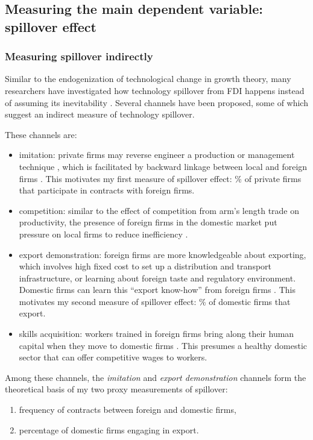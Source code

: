 \subsection{Measuring the main dependent variable: spillover effect}
\label{sec:measure_spillover}

\subsubsection*{Measuring spillover indirectly}

Similar to the endogenization of technological change in growth theory, many researchers have investigated how technology spillover from FDI happens instead of assuming its inevitability \citep{Romer1994}. Several channels have been proposed, some of which suggest an indirect measure of technology spillover.

These channels are:
\begin{itemize}
	\item imitation:  private firms may reverse engineer a production or management technique \citep{Wang1992}, which is facilitated by backward linkage between local and foreign firms \citep{Javorcik2004}. This motivates my first measure of spillover effect: \% of private firms that participate in contracts with foreign firms.
	\item competition: similar to the effect of competition from arm's length trade on productivity, the presence of foreign firms in the domestic market put pressure on local firms to reduce inefficiency \citep{Glass2002}.
	\item export demonstration: foreign firms are more knowledgeable about exporting, which involves high fixed cost to set up a distribution and transport infrastructure, or learning about foreign taste and regulatory environment. Domestic firms can learn this ``export know-how'' from foreign firms \citep{Aitken1997}. This motivates my second measure of spillover effect: \% of domestic firms that export.
	\item skills acquisition: workers trained in foreign firms bring along their human capital when they move to domestic firms \citep{Djankov2000}. This presumes a healthy domestic sector that can offer competitive wages to workers.
\end{itemize}

Among these channels, the \textit{imitation} and \textit{export demonstration} channels form the theoretical basis of my two proxy measurements of spillover:
\begin{enumerate}
\item frequency of contracts between foreign and domestic firms,
\item percentage of domestic firms engaging in export.
\end{enumerate}

